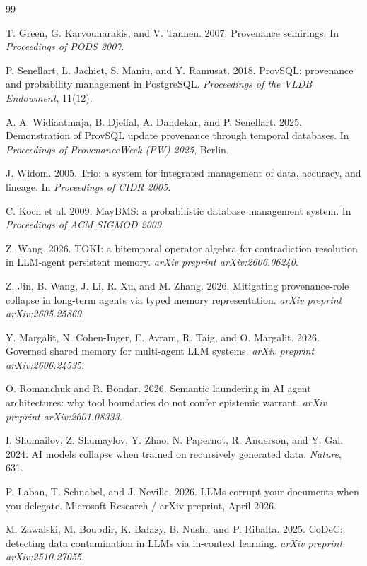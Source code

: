\documentclass[sigconf,nonacm]{acmart}
\begin{document}
\begin{thebibliography}{99}
\small

T. Green, G. Karvounarakis, and V. Tannen. 2007. Provenance semirings. In \emph{Proceedings of PODS 2007}.

P. Senellart, L. Jachiet, S. Maniu, and Y. Ramusat. 2018. ProvSQL: provenance and probability management in PostgreSQL. \emph{Proceedings of the VLDB Endowment}, 11(12).

A. A. Widiaatmaja, B. Djeffal, A. Dandekar, and P. Senellart. 2025. Demonstration of ProvSQL update provenance through temporal databases. In \emph{Proceedings of ProvenanceWeek (PW) 2025}, Berlin.

J. Widom. 2005. Trio: a system for integrated management of data, accuracy, and lineage. In \emph{Proceedings of CIDR 2005}.

C. Koch et al. 2009. MayBMS: a probabilistic database management system. In \emph{Proceedings of ACM SIGMOD 2009}.

Z. Wang. 2026. TOKI: a bitemporal operator algebra for contradiction resolution in LLM-agent persistent memory. \emph{arXiv preprint arXiv:2606.06240}.

Z. Jin, B. Wang, J. Li, R. Xu, and M. Zhang. 2026. Mitigating provenance-role collapse in long-term agents via typed memory representation. \emph{arXiv preprint arXiv:2605.25869}.

Y. Margalit, N. Cohen-Inger, E. Avram, R. Taig, and O. Margalit. 2026. Governed shared memory for multi-agent LLM systems. \emph{arXiv preprint arXiv:2606.24535}.

O. Romanchuk and R. Bondar. 2026. Semantic laundering in AI agent architectures: why tool boundaries do not confer epistemic warrant. \emph{arXiv preprint arXiv:2601.08333}.

I. Shumailov, Z. Shumaylov, Y. Zhao, N. Papernot, R. Anderson, and Y. Gal. 2024. AI models collapse when trained on recursively generated data. \emph{Nature}, 631.

P. Laban, T. Schnabel, and J. Neville. 2026. LLMs corrupt your documents when you delegate. Microsoft Research / arXiv preprint, April 2026.

M. Zawalski, M. Boubdir, K. Bałazy, B. Nushi, and P. Ribalta. 2025. CoDeC: detecting data contamination in LLMs via in-context learning. \emph{arXiv preprint arXiv:2510.27055}.


\end{thebibliography}
\end{document}
